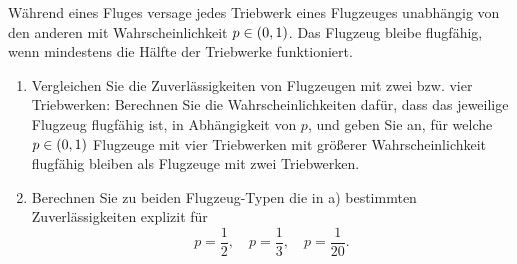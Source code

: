 \documentclass{exercise}
\begin{document}
    \begin{problem}
        Während eines Fluges versage jedes Triebwerk eines Flugzeuges unabhängig von den anderen mit Wahrscheinlichkeit \(p \in \parentheses*{0, 1}\).
        Das Flugzeug bleibe flugfähig, wenn mindestens die Hälfte der Triebwerke funktioniert.
        \begin{enumerate}
            \item Vergleichen Sie die Zuverlässigkeiten von Flugzeugen mit zwei bzw. vier Triebwerken: Berechnen Sie die Wahrscheinlichkeiten dafür, dass das jeweilige Flugzeug flugfähig ist, in Abhängigkeit von \(p\), und geben Sie an, für welche \(p \in \parentheses*{0, 1}\) Flugzeuge mit vier Triebwerken mit größerer Wahrscheinlichkeit flugfähig bleiben als Flugzeuge mit zwei Triebwerken.
            \item Berechnen Sie zu beiden Flugzeug-Typen die in a) bestimmten Zuverlässigkeiten explizit für
            \[
                p = \frac{1}{2}, \quad p = \frac{1}{3}, \quad p = \frac{1}{20}.
            \]
        \end{enumerate}
    \end{problem}
\end{document}
